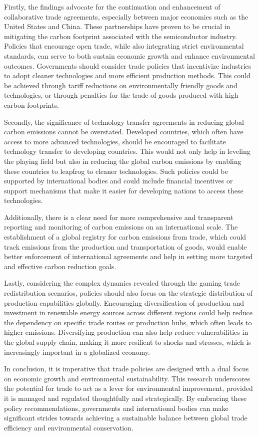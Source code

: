 Firstly, the findings advocate for the continuation and enhancement of collaborative trade agreements, especially between major economies such as the United States and China. These partnerships have proven to be crucial in mitigating the carbon footprint associated with the semiconductor industry. Policies that encourage open trade, while also integrating strict environmental standards, can serve to both sustain economic growth and enhance environmental outcomes. Governments should consider trade policies that incentivize industries to adopt cleaner technologies and more efficient production methods. This could be achieved through tariff reductions on environmentally friendly goods and technologies, or through penalties for the trade of goods produced with high carbon footprints.

Secondly, the significance of technology transfer agreements in reducing global carbon emissions cannot be overstated. Developed countries, which often have access to more advanced technologies, should be encouraged to facilitate technology transfer to developing countries. This would not only help in leveling the playing field but also in reducing the global carbon emissions by enabling these countries to leapfrog to cleaner technologies. Such policies could be supported by international bodies and could include financial incentives or support mechanisms that make it easier for developing nations to access these technologies.

Additionally, there is a clear need for more comprehensive and transparent reporting and monitoring of carbon emissions on an international scale. The establishment of a global registry for carbon emissions from trade, which could track emissions from the production and transportation of goods, would enable better enforcement of international agreements and help in setting more targeted and effective carbon reduction goals.

Lastly, considering the complex dynamics revealed through the gaming trade redistribution scenarios, policies should also focus on the strategic distribution of production capabilities globally. Encouraging diversification of production and investment in renewable energy sources across different regions could help reduce the dependency on specific trade routes or production hubs, which often leads to higher emissions. Diversifying production can also help reduce vulnerabilities in the global supply chain, making it more resilient to shocks and stresses, which is increasingly important in a globalized economy.

In conclusion, it is imperative that trade policies are designed with a dual focus on economic growth and environmental sustainability. This research underscores the potential for trade to act as a lever for environmental improvement, provided it is managed and regulated thoughtfully and strategically. By embracing these policy recommendations, governments and international bodies can make significant strides towards achieving a sustainable balance between global trade efficiency and environmental conservation.